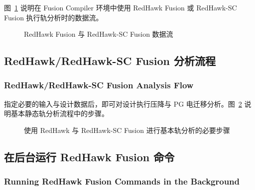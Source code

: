 图~\ref{fig:rh-dataflow} 说明在 Fusion Compiler 环境中使用 RedHawk Fusion 或 RedHawk-SC Fusion 执行轨分析时的数据流。

\begin{figure}[htbp]
\centering
{}
\caption{RedHawk Fusion 与 RedHawk-SC Fusion 数据流}
\label{fig:rh-dataflow}
\end{figure}

\subsection{RedHawk/RedHawk-SC Fusion 分析流程}
\subsubsection*{RedHawk/RedHawk-SC Fusion Analysis Flow}

指定必要的输入与设计数据后，即可对设计执行压降与 PG 电迁移分析。图~\ref{fig:rh-basic-steps} 说明基本静态轨分析流程中的步骤。

\begin{figure}[htbp]
\centering
{}
\caption{使用 RedHawk 与 RedHawk-SC Fusion 进行基本轨分析的必要步骤}
\label{fig:rh-basic-steps}
\end{figure}

\subsection{在后台运行 RedHawk Fusion 命令}
\subsubsection*{Running RedHawk Fusion Commands in the Background}

